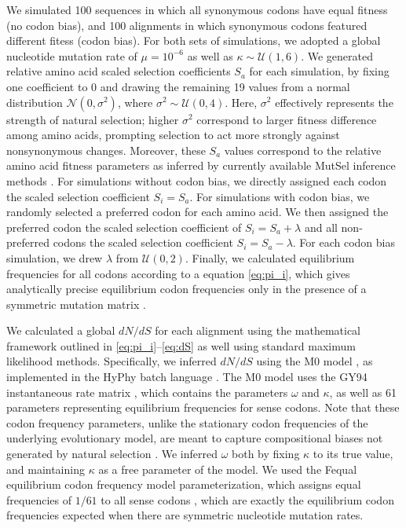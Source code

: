 \documentclass{pnastwo}
\begin{document}
\begin{article}
		
		We simulated 100 sequences in which all synonymous codons have equal fitness (no codon bias), and 100 alignments in which synonymous codons featured different fitess (codon bias). For both sets of simulations, we adopted a global nucleotide mutation rate of $\mu = 10^{-6}$ as well as $\kappa \sim \mathcal{U} (1,6)$. We generated relative amino acid scaled selection coefficients $S_a$ for each simulation, by fixing one coefficient to 0 and drawing the remaining 19 values from a normal distribution $\mathcal{N}(0,\sigma^2)$, where $\sigma^2 \sim \mathcal{U}(0,4)$. Here, $\sigma^2$ effectively represents the strength of natural selection; higher $\sigma^2$ correspond to larger fitness difference among amino acids, prompting selection to act more strongly against nonsynonymous changes. Moreover, these $S_a$ values correspond to the relative amino acid fitness parameters as inferred by currently available MutSel inference methods \cite{Tamurietal2014,RodrigueLartillot2014}. For simulations without codon bias, we directly assigned each codon the scaled selection coefficient $S_i = S_a$. For simulations with codon bias, we randomly selected a preferred codon for each amino acid. We then assigned the preferred codon the scaled selection coefficient of $S_i = S_a + \lambda$ and all non-preferred codons the scaled selection coefficient $S_i = S_a - \lambda$. For each codon bias simulation, we drew $\lambda$ from $\mathcal{U}(0,2)$. Finally, we calculated equilibrium frequencies for all codons according to a equation \eqref{eq:pi_i}, which gives analytically precise equilibrium codon frequencies only in the presence of a symmetric mutation matrix \cite{SellaHirsh2005}.
		
		We calculated a global $dN/dS$ for each alignment using the mathematical framework outlined in \eqref{eq:pi_i}--\eqref{eq:dS} as well using standard maximum likelihood methods. Specifically, we inferred $dN/dS$ using the M0 model \cite{Yangetal2000}, as implemented in the HyPhy batch language \cite{KosakovskyPondetal2005}. The M0 model uses the GY94 instantaneous rate matrix \cite{GoldmanYang1994,NielsenYang1998}, which contains the parameters $\omega$ and $\kappa$, as well as 61 parameters representing equilibrium frequencies for sense codons. Note that these codon frequency parameters, unlike the stationary codon frequencies of the underlying evolutionary model, are meant to capture compositional biases not generated by natural selection \cite{GoldmanYang1994,MuseGaut1994,YN00,Yang2006}. We inferred $\omega$ both by fixing $\kappa$ to its true value, and maintaining $\kappa$ as a free parameter of the model. We used the Fequal equilibrium codon frequency model parameterization, which assigns equal frequencies of $1/61$ to all sense codons \cite{Yang2006}, which are exactly the equilibrium codon frequencies expected when there are symmetric nucleotide mutation rates.
		

\end{article}
\end{document}
